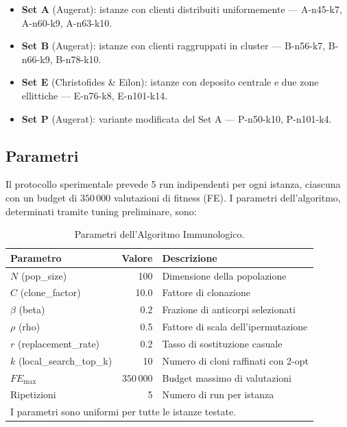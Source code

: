 \documentclass[a4paper,12pt]{article}
\begin{document}
\begin{itemize}[leftmargin=*]
    \item \textbf{Set A} (Augerat): istanze con clienti distribuiti uniformemente --- A-n45-k7, A-n60-k9, A-n63-k10.
    \item \textbf{Set B} (Augerat): istanze con clienti raggruppati in cluster --- B-n56-k7, B-n66-k9, B-n78-k10.
    \item \textbf{Set E} (Christofides \& Eilon): istanze con deposito centrale e due zone ellittiche --- E-n76-k8, E-n101-k14.
    \item \textbf{Set P} (Augerat): variante modificata del Set A --- P-n50-k10, P-n101-k4.
\end{itemize}

\subsection{Parametri}

Il protocollo sperimentale prevede 5 run indipendenti per ogni istanza, ciascuna con un budget di $350\,000$ valutazioni di fitness (FE). I parametri dell'algoritmo, determinati tramite tuning preliminare, sono:

\begin{table}[H]
\centering
\caption{Parametri dell'Algoritmo Immunologico.}
\label{tab:params}
\begin{tabular}{lrl}
\toprule
Parametro & Valore & Descrizione \\
\midrule
$N$ (pop\_size) & 100 & Dimensione della popolazione \\
$C$ (clone\_factor) & 10.0 & Fattore di clonazione \\
$\beta$ (beta) & 0.2 & Frazione di anticorpi selezionati \\
$\rho$ (rho) & 0.5 & Fattore di scala dell'ipermutazione \\
$r$ (replacement\_rate) & 0.2 & Tasso di sostituzione casuale \\
$k$ (local\_search\_top\_k) & 10 & Numero di cloni raffinati con 2-opt \\
$FE_{\max}$ & $350\,000$ & Budget massimo di valutazioni \\
Ripetizioni & 5 & Numero di run per istanza \\
\midrule
\multicolumn{3}{l}{\small I parametri sono uniformi per tutte le istanze testate.} \\
\bottomrule
\end{tabular}
\end{table}
\end{document}
